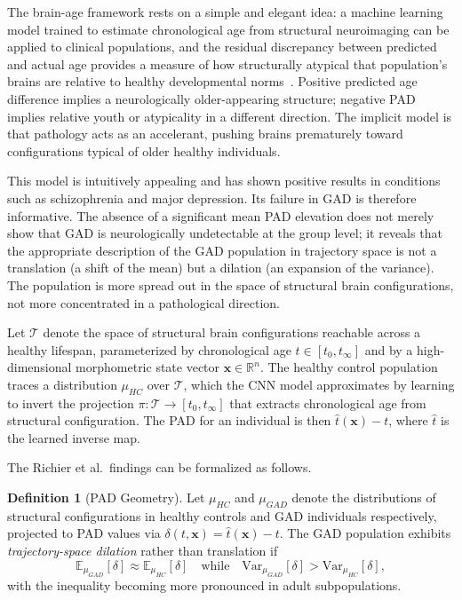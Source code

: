 \documentclass[11pt,a4paper]{article}
\theoremstyle{plain}
\theoremstyle{definition}
\newtheorem{definition}[theorem]{Definition}
\begin{document}
The brain-age framework rests on a simple and elegant idea: a machine learning model
trained to estimate chronological age from structural neuroimaging can be applied to
clinical populations, and the residual discrepancy between predicted and actual age
provides a measure of how structurally atypical that population's brains are relative
to healthy developmental norms~\cite{Richier2026}. Positive predicted age difference
implies a neurologically older-appearing structure; negative PAD implies relative youth
or atypicality in a different direction. The implicit model is that pathology acts as an
accelerant, pushing brains prematurely toward configurations typical of older healthy
individuals.

This model is intuitively appealing and has shown positive results in conditions such as
schizophrenia and major depression. Its failure in GAD is therefore informative. The
absence of a significant mean PAD elevation does not merely show that GAD is neurologically
undetectable at the group level; it reveals that the appropriate description of the
GAD population in trajectory space is not a translation (a shift of the mean) but a
dilation (an expansion of the variance). The population is more spread out in the
space of structural brain configurations, not more concentrated in a pathological direction.

Let $\mathcal{T}$ denote the space of structural brain configurations reachable across
a healthy lifespan, parameterized by chronological age $t \in [t_0, t_\infty]$ and
by a high-dimensional morphometric state vector $\mathbf{x} \in \mathbb{R}^n$.
The healthy control population traces a distribution $\mu_{HC}$ over $\mathcal{T}$,
which the CNN model approximates by learning to invert the projection
$\pi: \mathcal{T} \to [t_0, t_\infty]$ that extracts chronological age from structural
configuration. The PAD for an individual is then $\hat{t}(\mathbf{x}) - t$,
where $\hat{t}$ is the learned inverse map.

The Richier et al.\ findings can be formalized as follows.

\begin{definition}[PAD Geometry]
Let $\mu_{HC}$ and $\mu_{GAD}$ denote the distributions of structural configurations
in healthy controls and GAD individuals respectively, projected to PAD values via
$\delta(t, \mathbf{x}) = \hat{t}(\mathbf{x}) - t$. The GAD population exhibits
\emph{trajectory-space dilation} rather than translation if
\[
\mathbb{E}_{\mu_{GAD}}[\delta] \approx \mathbb{E}_{\mu_{HC}}[\delta]
\quad \text{while} \quad
\mathrm{Var}_{\mu_{GAD}}[\delta] > \mathrm{Var}_{\mu_{HC}}[\delta],
\]
with the inequality becoming more pronounced in adult subpopulations.
\end{definition}
\end{document}
